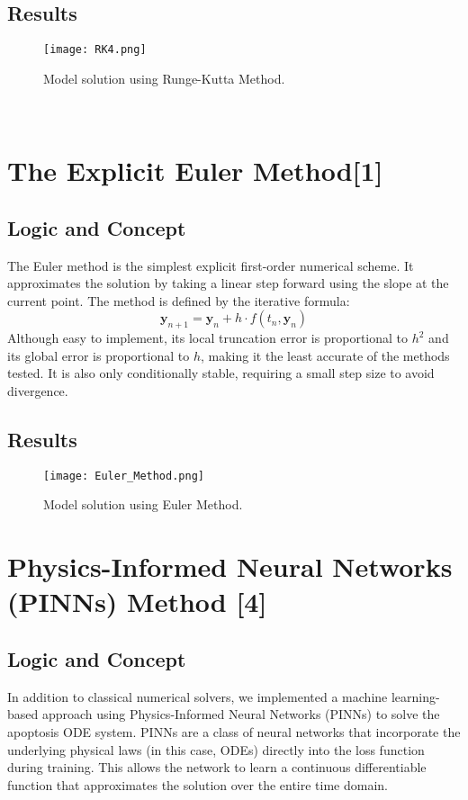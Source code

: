 \documentclass[conference]{IEEEtran}
\begin{document}
\subsection{Results}
\begin{figure}[htbp]
\centerline{\texttt{[image: RK4.png]}}
\caption{Model solution using Runge-Kutta Method.}
\label{fig:rk4}
\end{figure}
\
\
\
\section{The Explicit Euler Method[1]}
\subsection{Logic and Concept}
The Euler method is the simplest explicit first-order numerical scheme. It approximates the solution by taking a linear step forward using the slope at the current point. The method is defined by the iterative formula:
\begin{equation}
\mathbf{y}_{n+1} = \mathbf{y}_n + h \cdot f(t_n, \mathbf{y}_n)
\end{equation}
Although easy to implement, its local truncation error is proportional to $h^2$ and its global error is proportional to $h$, making it the least accurate of the methods tested. It is also only conditionally stable, requiring a small step size to avoid divergence.

\subsection{Results}
\begin{figure}[htbp]
\centerline{\texttt{[image: Euler\_Method.png]}}
\caption{Model solution using Euler Method.}
\label{fig:euler}
\end{figure}

\section{Physics-Informed Neural Networks (PINNs) Method [4]}
\subsection{Logic and Concept}
In addition to classical numerical solvers, we implemented a machine learning-based approach using Physics-Informed Neural Networks (PINNs) to solve the apoptosis ODE system. PINNs are a class of neural networks that incorporate the underlying physical laws (in this case, ODEs) directly into the loss function during training. This allows the network to learn a continuous differentiable function that approximates the solution over the entire time domain.
\end{document}
